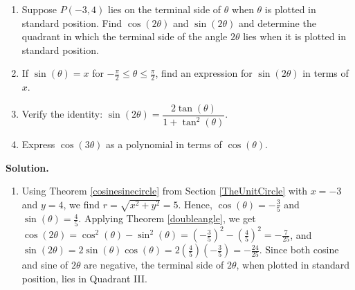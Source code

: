 \begin{ex}  \label{doubleangleex} $~$

\begin{enumerate}

\item Suppose $P(-3,4)$ lies on the terminal side of $\theta$ when $\theta$ is plotted in standard position.  Find $\cos(2\theta)$ and $\sin(2\theta)$ and determine the quadrant in which the terminal side of the angle $2\theta$ lies when it is plotted in standard position.

\item  If $\sin(\theta) = x$ for $-\frac{\pi}{2} \leq \theta \leq \frac{\pi}{2}$, find an expression for $\sin(2\theta)$ in terms of $x$.

\item  \label{doubleanglesinewtan} Verify the identity:  $\sin(2\theta) = \dfrac{2\tan(\theta)}{1 + \tan^{2}(\theta)}$.

\item  Express $\cos(3\theta)$ as a polynomial in terms of $\cos(\theta)$.
\label{cosinepolynomial}

\end{enumerate}


{\bf Solution.}

\begin{enumerate}

\item  Using Theorem \ref{cosinesinecircle} from Section \ref{TheUnitCircle} with  $x = -3$ and $y=4$, we find $r = \sqrt{x^2+y^2} = 5$.  Hence, $\cos(\theta) = -\frac{3}{5}$ and $\sin(\theta) = \frac{4}{5}$.  Applying Theorem \ref{doubleangle}, we get $\cos(2\theta) = \cos^{2}(\theta) - \sin^{2}(\theta) = \left(-\frac{3}{5}\right)^2 - \left(\frac{4}{5}\right)^2 = -\frac{7}{25}$, and $\sin(2\theta) = 2 \sin(\theta) \cos(\theta) = 2 \left(\frac{4}{5}\right)\left(-\frac{3}{5}\right) = -\frac{24}{25}$.  Since both cosine and sine of $2\theta$ are negative, the terminal side of $2\theta$, when plotted in standard position, lies in Quadrant III.



\end{enumerate}
\end{ex}
